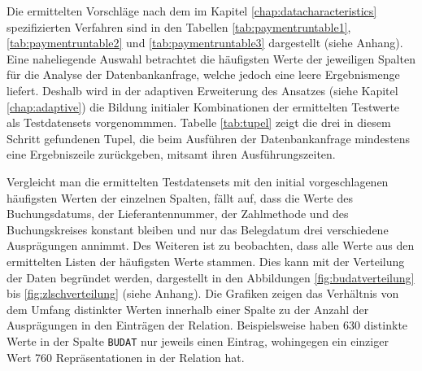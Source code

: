 Die ermittelten Vorschläge nach dem im Kapitel \ref{chap:datacharacteristics} spezifizierten Verfahren sind in den Tabellen \ref{tab:paymentruntable1}, \ref{tab:paymentruntable2} und \ref{tab:paymentruntable3} dargestellt (siehe Anhang).
Eine naheliegende Auswahl betrachtet die häufigsten Werte der jeweiligen Spalten für die Analyse der Datenbankanfrage, welche jedoch eine leere Ergebnismenge liefert.
Deshalb wird in der adaptiven Erweiterung des Ansatzes (siehe Kapitel \ref{chap:adaptive}) die Bildung initialer Kombinationen der ermittelten Testwerte als Testdatensets vorgenommmen.
Tabelle \ref{tab:tupel} zeigt die drei in diesem Schritt gefundenen Tupel, die beim Ausführen der Datenbankanfrage mindestens eine Ergebniszeile zurückgeben, mitsamt ihren Ausführungszeiten.
\begin{table}[h]
	\centering
	\caption{Gefundene Tupel für Testdatensets}
	\label{tab:tupel}
\end{table}

Vergleicht man die ermittelten Testdatensets mit den initial vorgeschlagenen häufigsten Werten der einzelnen Spalten, fällt auf, dass die Werte des Buchungsdatums, der Lieferantennummer, der Zahlmethode und des Buchungskreises konstant bleiben und nur das Belegdatum drei verschiedene Ausprägungen annimmt.
Des Weiteren ist zu beobachten, dass alle Werte aus den ermittelten Listen der häufigsten Werte stammen.
Dies kann mit der Verteilung der Daten begründet werden, dargestellt in den Abbildungen \ref{fig:budatverteilung} bis \ref{fig:zlschverteilung} (siehe Anhang).
Die Grafiken zeigen das Verhältnis von dem Umfang distinkter Werten innerhalb einer Spalte zu der Anzahl der Ausprägungen in den Einträgen der Relation.
Beispielsweise haben 630 distinkte Werte in der Spalte \texttt{BUDAT} nur jeweils einen Eintrag, wohingegen ein einziger Wert 760 Repräsentationen in der Relation hat.

